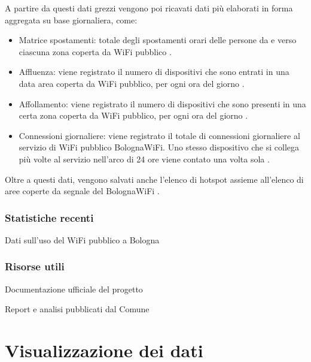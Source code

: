 A partire da questi dati grezzi vengono poi ricavati dati più elaborati in forma aggregata su base giornaliera, come:
\begin{itemize}
    \item Matrice spostamenti: totale degli spostamenti orari delle persone da e verso ciascuna zona coperta da WiFi pubblico \cite{BolognaWiFi_Spostamenti}.
    \item Affluenza: viene registrato il numero di dispositivi che sono entrati in una data area coperta da WiFi pubblico, per ogni ora del giorno \cite{BolognaWiFi_Affluenza}.
    \item Affollamento: viene registrato il numero di dispositivi che sono presenti in una certa zona coperta da WiFi pubblico, per ogni ora del giorno \cite{BolognaWiFi_Affollamento}.
    \item Connessioni giornaliere: viene registrato il totale di connessioni giornaliere al servizio di WiFi pubblico BolognaWiFi. Uno stesso dispositivo che si collega più volte al servizio nell'arco di 24 ore viene contato una volta sola \cite{BolognaWiFi_Connessioni_Giornaliere}.
\end{itemize}
Oltre a questi dati, vengono salvati anche l'elenco di hotspot \cite{BolognaWiFi_Elenco_Hotspot} assieme all'elenco di aree coperte da segnale del BolognaWiFi \cite{BolognaWiFi_Elenco_Aree_Segnale}.

\subsubsection{Statistiche recenti}
Dati sull'uso del WiFi pubblico a Bologna

\subsubsection{Risorse utili}
Documentazione ufficiale del progetto

Report e analisi pubblicati dal Comune


\section{Visualizzazione dei dati}  %
